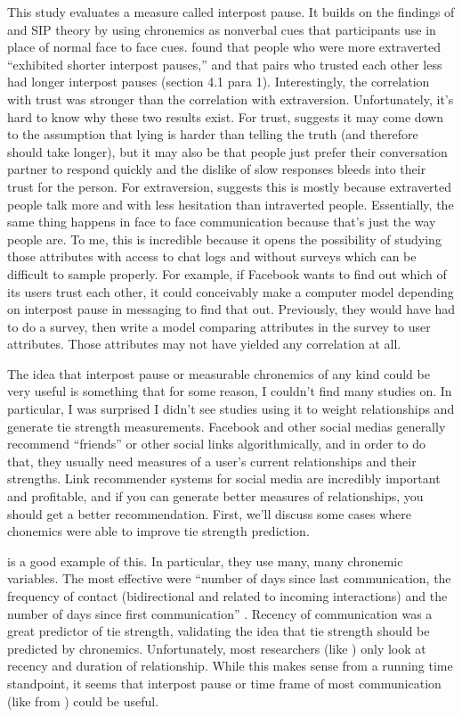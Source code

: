 \documentclass[
  stu]{apa7}
\begin{document}
This study evaluates a measure called interpost pause. It builds on the
findings of \textcite{kalman11} and SIP theory by using chronemics as
nonverbal cues that participants use in place of normal face to face
cues. \textcite{kalman13} found that people who were more extraverted
``exhibited shorter interpost pauses,'' and that pairs who trusted each
other less had longer interpost pauses (section 4.1 para 1).
Interestingly, the correlation with trust was stronger than the
correlation with extraversion. Unfortunately, it's hard to know why
these two results exist. For trust, \textcite{kalman13} suggests it may
come down to the assumption that lying is harder than telling the truth
(and therefore should take longer), but it may also be that people just
prefer their conversation partner to respond quickly and the dislike of
slow responses bleeds into their trust for the person. For extraversion,
\textcite{kalman13} suggests this is mostly because extraverted people
talk more and with less hesitation than intraverted people. Essentially,
the same thing happens in face to face communication because that's just
the way people are. To me, this is incredible because it opens the
possibility of studying those attributes with access to chat logs and
without surveys which can be difficult to sample properly. For example,
if Facebook wants to find out which of its users trust each other, it
could conceivably make a computer model depending on interpost pause in
messaging to find that out. Previously, they would have had to do a
survey, then write a model comparing attributes in the survey to user
attributes. Those attributes may not have yielded any correlation at
all.

The idea that interpost pause or measurable chronemics of any kind could
be very useful is something that for some reason, I couldn't find many
studies on. In particular, I was surprised I didn't see studies using it
to weight relationships and generate tie strength measurements. Facebook
and other social medias generally recommend ``friends'' or other social
links algorithmically, and in order to do that, they usually need
measures of a user's current relationships and their strengths. Link
recommender systems for social media are incredibly important and
profitable, and if you can generate better measures of relationships,
you should get a better recommendation. First, we'll discuss some cases
where chonemics were able to improve tie strength prediction.

\textcite{arnaboldi13} is a good example of this. In particular, they
use many, many chronemic variables. The most effective were ``number of
days since last communication, the frequency of contact (bidirectional
and related to incoming interactions) and the number of days since first
communication'' \autocite[ 1137]{arnaboldi13}. Recency of communication
was a great predictor of tie strength, validating the idea that tie
strength should be predicted by chronemics. Unfortunately, most
researchers (like \textcite{servia-rodriguez14}) only look at recency
and duration of relationship. While this makes sense from a running time
standpoint, it seems that interpost pause or time frame of most
communication (like from \textcite{walther95}) could be useful.
\end{document}

